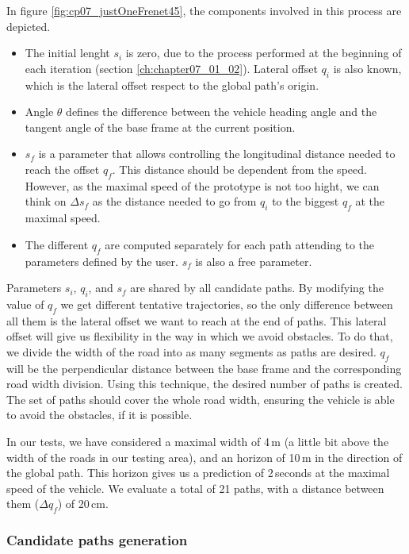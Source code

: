 In figure \ref{fig:cp07_justOneFrenet45}, the components involved in this process are depicted.
\begin{itemize}
 \item The initial lenght $s_i$ is zero, due to the process performed at the beginning of each iteration (section \ref{ch:chapter07_01_02}). Lateral offset $q_i$ is also known, which is the lateral offset respect to the global path's origin.
 \item Angle $\theta$ defines the difference between the vehicle heading angle and the tangent angle of the base frame at the current position.
 \item $s_f$ is a parameter that allows controlling the longitudinal distance needed to reach the offset $q_f$. This distance should be dependent from the speed. However, as the maximal speed of the prototype is not too hight, we can think on $\Delta s_f$ as the distance needed to go from $q_i$ to the biggest $q_f$ at the maximal speed.
 \item The different $q_f$ are computed separately for each path attending to the parameters defined by the user. $s_f$ is also a free parameter.
\end{itemize}

Parameters $s_i$, $q_i$, and $s_f$ are shared by all candidate paths. By modifying the value of $q_f$ we get different tentative trajectories, so the only difference between all them is the lateral offset we want to reach at the end of paths. This lateral offset will give us flexibility in the way in which we avoid obstacles. To do that, we divide the width of the road into as many segments as paths are desired. $q_f$ will be the perpendicular distance between the base frame and the corresponding road width division. Using this technique, the desired number of paths is created. The set of paths should cover the whole road width, ensuring the vehicle is able to avoid the obstacles, if it is possible.

In our tests, we have considered a maximal width of 4\,m (a little bit above the width of the roads in our testing area), and an horizon of 10\,m in the direction of the global path. This horizon gives us a prediction of 2\,seconds at the maximal speed of the vehicle. We evaluate a total of 21 paths, with a distance between them ($\Delta q_f$) of 20\,cm.

\subsubsection{Candidate paths generation}\label{ch:chapter07_01_03_02}

